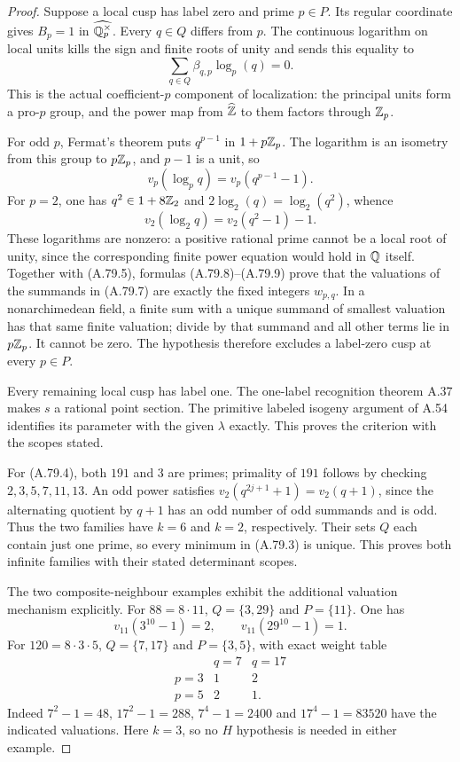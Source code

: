\begin{proof}
Suppose a local cusp has label zero and prime $p\in P$.
Its regular coordinate gives $B_p=1$ in
$\widehat{\mathbb Q_p^\times}$.
Every $q\in Q$ differs from $p$.
The continuous logarithm on local units kills the sign and
finite roots of unity and sends this equality to
\[
                       \sum_{q\in Q}
                                 \beta_{q,p}\log_p(q)=0.
\tag{A.79.7}
\]
This is the actual coefficient-$p$ component of localization:
the principal units form a pro-$p$ group, and the power map
from $\widehat{\mathbb Z}$ to them factors through $\mathbb Z_p$.

For odd $p$, Fermat's theorem puts $q^{p-1}$ in
$1+p\mathbb Z_p$.  The logarithm is an isometry from this group
to $p\mathbb Z_p$, and $p-1$ is a unit, so
\[
                    v_p(\log_p q)=v_p(q^{p-1}-1).
\tag{A.79.8}
\]
For $p=2$, one has $q^2\in1+8\mathbb Z_2$ and
$2\log_2(q)=\log_2(q^2)$, whence
\[
                    v_2(\log_2 q)=v_2(q^2-1)-1.
\tag{A.79.9}
\]
These logarithms are nonzero: a positive rational prime
cannot be a local root of unity, since the corresponding
finite power equation would hold in $\mathbb Q$ itself.
Together with (A.79.5), formulas (A.79.8)--(A.79.9) prove
that the valuations of the summands in (A.79.7) are
exactly the fixed integers $w_{p,q}$.
In a nonarchimedean field, a finite sum with a unique
summand of smallest valuation has that same finite valuation;
divide by that summand and all other terms lie in $p\mathbb Z_p$.
It cannot be zero.  The hypothesis therefore excludes a
label-zero cusp at every $p\in P$.

Every remaining local cusp has label one.  The one-label
recognition theorem A.37 makes $s$ a rational point section.
The primitive labeled isogeny argument of A.54 identifies
its parameter with the given $\lambda$ exactly.
This proves the criterion with the scopes stated.

For (A.79.4), both $191$ and $3$ are primes; primality of
$191$ follows by checking $2,3,5,7,11,13$.
An odd power satisfies
$v_2(q^{2j+1}+1)=v_2(q+1)$, since the alternating quotient
by $q+1$ has an odd number of odd summands and is odd.
Thus the two families have $k=6$ and $k=2$, respectively.
Their sets $Q$ each contain just one prime, so every
minimum in (A.79.3) is unique.  This proves both infinite
families with their stated determinant scopes.

The two composite-neighbour examples exhibit the additional
valuation mechanism explicitly.  For $88=8\cdot11$,
$Q=\{3,29\}$ and $P=\{11\}$.  One has
\[
             v_{11}(3^{10}-1)=2,\qquad
             v_{11}(29^{10}-1)=1.
\tag{A.79.10}
\]
For $120=8\cdot3\cdot5$, $Q=\{7,17\}$ and
$P=\{3,5\}$, with exact weight table
\[
 \begin{array}{c|cc}
             &q=7&q=17\\ \hline
 p=3&1&2\\
 p=5&2&1.
 \end{array}
\tag{A.79.11}
\]
Indeed $7^2-1=48$, $17^2-1=288$, $7^4-1=2400$
and $17^4-1=83520$ have the indicated valuations.
Here $k=3$, so no $H$ hypothesis is needed in either example.
\end{proof}

